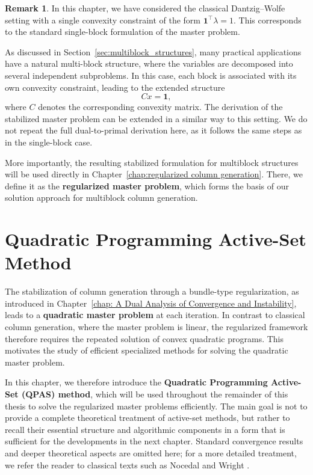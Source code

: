 \documentclass{book}
\theoremstyle{definition}
\newtheorem{remark}[theorem]{Remark}
\newcounter{algorithm_}
\numberwithin{algorithm_}{chapter}
\begin{document}
\begin{remark}
In this chapter, we have considered the classical Dantzig--Wolfe setting with a single convexity constraint of the form $\mathbf{1}^\top \lambda = 1$. This corresponds to the standard single-block formulation of the master problem.

\medskip

As discussed in Section~\ref{sec:multiblock_structures}, many practical applications have a natural multi-block structure, where the variables are decomposed into several independent subproblems. In this case, each block is associated with its own convexity constraint, leading to the extended structure
\[
C x = \mathbf{1},
\]
where $C$ denotes the corresponding convexity matrix. The derivation of the stabilized master problem can be extended in a similar way to this setting. We do not repeat the full dual-to-primal derivation here, as it follows the same steps as in the single-block case.

\medskip

More importantly, the resulting stabilized formulation for multiblock structures will be used directly in Chapter~\ref{chap:regularized column generation}. There, we define it as the \textbf{regularized master problem}, which forms the basis of our solution approach for multiblock column generation.

\end{remark}




\newpage

\chapter{Quadratic Programming Active-Set Method}
\label{chap:Quadratic Programming Active-Set Method}

\vspace*{\fill}

The stabilization of column generation through a bundle-type regularization, as introduced in Chapter~\ref{chap: A Dual Analysis of Convergence and Instability}, leads to a \textbf{quadratic master problem} at each iteration. In contrast to classical column generation, where the master problem is linear, the regularized framework therefore requires the repeated solution of convex quadratic programs. This motivates the study of efficient specialized methods for solving the quadratic master problem.

\medskip

In this chapter, we therefore introduce the \textbf{Quadratic Programming Active-Set (QPAS) method}, which will be used throughout the remainder of this thesis to solve the regularized master problems efficiently. The main goal is not to provide a complete theoretical treatment of active-set methods, but rather to recall their essential structure and algorithmic components in a form that is sufficient for the developments in the next chapter. Standard convergence results and deeper theoretical aspects are omitted here; for a more detailed treatment, we refer the reader to classical texts such as Nocedal and Wright \cite{nocedal2006numerical}.
\end{document}
